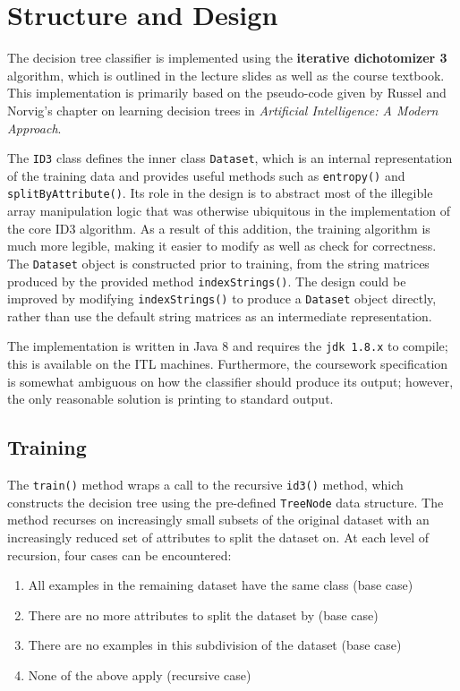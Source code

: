 \documentclass[10pt, titlepage]{article}
\begin{document}
\section{Structure and Design}
The decision tree classifier is implemented using the \textbf{iterative dichotomizer 3} algorithm, which is outlined in the lecture slides as well as the course textbook. This implementation is primarily based on the pseudo-code given by Russel and Norvig's chapter on learning decision trees in \textit{Artificial Intelligence: A Modern Approach}.

The \texttt{ID3} class defines the inner class \texttt{Dataset}, which is an internal representation of the training data and provides useful methods such as \texttt{entropy()} and \texttt{splitByAttribute()}. Its role in the design is to abstract most of the illegible array manipulation logic that was otherwise ubiquitous in the implementation of the core ID3 algorithm. As a result of this addition, the training algorithm is much more legible, making it easier to modify as well as check for correctness. The \texttt{Dataset} object is constructed prior to training, from the string matrices produced by the provided method \texttt{indexStrings()}. The design could be improved by modifying \texttt{indexStrings()} to produce a \texttt{Dataset} object directly, rather than use the default string matrices as an intermediate representation.

The implementation is written in Java 8 and requires the \texttt{jdk 1.8.x} to compile; this is available on the ITL machines. Furthermore, the coursework specification is somewhat ambiguous on how the classifier should produce its output; however, the only reasonable solution is printing to standard output.


\subsection{Training}
The \texttt{train()} method wraps a call to the recursive \texttt{id3()} method, which constructs the decision tree using the pre-defined \texttt{TreeNode} data structure. The method recurses on increasingly small subsets of the original dataset with an increasingly reduced set of attributes to split the dataset on. At each level of recursion, four cases can be encountered:

\begin{enumerate}
\item All examples in the remaining dataset have the same class (base case)
\item There are no more attributes to split the dataset by (base case)
\item There are no examples in this subdivision of the dataset (base case)
\item None of the above apply (recursive case)
\end{enumerate}
\end{document}
